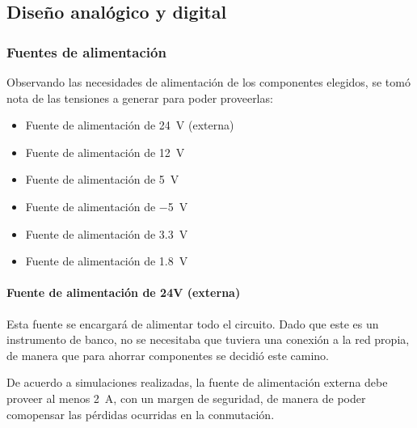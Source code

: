 \documentclass[titlepage, 12pt]{article}
\begin{document}
  \subsection{Diseño analógico y digital}

    \subsubsection{Fuentes de alimentación}
    Observando las necesidades de alimentación de los componentes elegidos, se tomó nota de las tensiones a generar para poder proveerlas:
        \begin{itemize}
            \item Fuente de alimentación de \SI{24}{V} (externa)
            \item Fuente de alimentación de \SI{12}{V}
            \item Fuente de alimentación de \SI{5}{V}
            \item Fuente de alimentación de \SI{-5}{V}
            \item Fuente de alimentación de \SI{3.3}{V}
            \item Fuente de alimentación de \SI{1.8}{V}
        \end{itemize}

      \paragraph{Fuente de alimentación de 24V (externa)}
      Esta fuente se encargará de alimentar todo el circuito. Dado que este es un instrumento de banco, no se necesitaba que tuviera una conexión a la red propia, de manera que para ahorrar componentes se decidió este camino.

      De acuerdo a simulaciones realizadas, la fuente de alimentación externa debe proveer al menos \SI{2}{A}, con un margen de seguridad, de manera de poder comopensar las pérdidas ocurridas en la conmutación.

\end{document}
